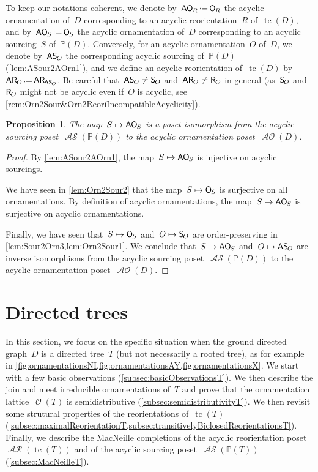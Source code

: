 \documentclass{amsart}
\newtheorem{proposition}[theorem]{Proposition}
\theoremstyle{definition}
\renewcommand{\c}[1]{\mathcal{#1}} %
\newcommand{\eqdef}{\mbox{\,\raisebox{0.2ex}{\scriptsize\ensuremath{\mathrm:}}\ensuremath{=}\,}} %
\DeclareMathOperator{\tc}{tc} %
\newcommand{\mymap}[2]{\mathsf{#1}_{\hspace{-.7pt}#2}}
\DeclareMathOperator{\Orn}{\c{O}}  %
\newcommand{\orn}[1]{\mymap{O}{#1}}  %
\DeclareMathOperator{\AOrn}{\c{AO}}  %
\newcommand{\aorn}[1]{\mymap{AO}{#1}}  %
\newcommand{\reori}[1]{\mymap{R}{#1}}  %
\DeclareMathOperator{\AReori}{\c{AR}}  %
\newcommand{\areori}[1]{\mymap{AR}{#1}}  %
\newcommand{\sour}[1]{\mymap{S}{#1}}  %
\DeclareMathOperator{\ASour}{\mathcal{AS}}  %
\newcommand{\asour}[1]{\mymap{AS}{#1}}  %
\newcommand{\PP}{\mathbb P} %
\begin{document}
To keep our notations coherent, we denote by~$\aorn{R} \eqdef \orn{R}$ the acyclic ornamentation of~$D$ corresponding to an acyclic reorientation~$R$ of~$\tc(D)$, and by~$\aorn{S} \eqdef \orn{S}$ the acyclic ornamentation of~$D$ corresponding to an acyclic sourcing~$S$ of~$\PP(D)$.
Conversely, for an acyclic ornamentation~$O$ of~$D$, we denote by~$\asour{O}$ the corresponding acyclic sourcing of~$\PP(D)$ (\cref{lem:ASour2AOrn1}), and we define an acyclic reorientation of~$\tc(D)$ by~$\areori{O} \eqdef \areori{\asour{O}}$.
Be careful that~$\asour{O} \ne \sour{O}$ and~$\areori{O} \ne \reori{O}$ in general (as~$\sour{O}$ and~$\reori{O}$ might not be acyclic even if~$O$ is acyclic, see \cref{rem:Orn2Sour&Orn2ReoriIncompatibleAcyclicity}).

\begin{proposition}
\label{prop:ASour2AOrn}
The map~$S \mapsto \aorn{S}$ is a poset isomorphism from the acyclic sourcing poset~$\ASour(\PP(D))$ to the acyclic ornamentation poset~$\AOrn(D)$.
\end{proposition}

\begin{proof}
By \cref{lem:ASour2AOrn1}, the map~$S \mapsto \aorn{S}$ is injective on acyclic sourcings.

We have seen in \cref{lem:Orn2Sour2} that the map~$S \mapsto \orn{S}$ is surjective on all ornamentations.
By definition of acyclic ornamentations, the map~$S \mapsto \aorn{S}$ is surjective on acyclic ornamentations.

Finally, we have seen that~$S \mapsto \orn{S}$ and~$O \mapsto \sour{O}$ are order-preserving in \cref{lem:Sour2Orn3,lem:Orn2Sour1}.
We conclude that~$S \mapsto \aorn{S}$ and~$O \mapsto \asour{O}$ are inverse isomorphisms from the acyclic sourcing poset~$\ASour(\PP(D))$ to the acyclic ornamentation poset~$\AOrn(D)$.
\end{proof}


\section{Directed trees}
\label{sec:trees}

In this section, we focus on the specific situation when the ground directed graph~$D$ is a directed tree~$T$ (but not necessarily a rooted tree), as for example in \cref{fig:ornamentationsNI,fig:ornamentationsAY,fig:ornamentationsX}.
We start with a few basic observations (\cref{subsec:basicObservationsT}).
We then describe the join and meet irreducible ornamentations of~$T$ and prove that the ornamentation lattice~$\Orn(T)$ is semidistributive (\cref{subsec:semidistributivityT}).
We then revisit some strutural properties of the reorientations of~$\tc(T)$ (\cref{subsec:maximalReorientationT,subsec:transitivelyBiclosedReorientationsT}).
Finally, we describe the MacNeille completions of the acyclic reorientation poset~$\AReori(\tc(T))$ and of the acyclic sourcing poset~$\ASour(\PP(T))$ (\cref{subsec:MacNeilleT}).
\end{document}
